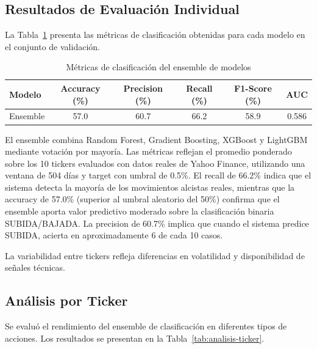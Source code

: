 \subsection{Resultados de Evaluación Individual}

La Tabla~\ref{tab:modelos-individuales} presenta las métricas de clasificación obtenidas para cada modelo en el conjunto de validación.

\begin{table}[H]
  \centering
  \caption{Métricas de clasificación del ensemble de modelos}
  \label{tab:modelos-individuales}
  \begin{tabular}{lccccc}
  \toprule
  \textbf{Modelo} & \textbf{Accuracy (\%)} & \textbf{Precision (\%)} & \textbf{Recall (\%)} & 
  \textbf{F1-Score (\%)} & \textbf{AUC} \\
  \midrule
  Ensemble  & 57.0 & 60.7 & 66.2 & 58.9 & 0.586 \\
  \bottomrule
  \end{tabular}
  \end{table}

  El ensemble combina Random Forest, Gradient Boosting, XGBoost y LightGBM mediante votación por mayoría. Las métricas reflejan el promedio ponderado sobre los 10 tickers evaluados con datos reales de Yahoo Finance, utilizando una ventana de 504 días y target con umbral de 0.5\%. El recall de 66.2\% indica que el sistema detecta la mayoría de los movimientos alcistas reales, mientras que la accuracy de 57.0\% (superior al umbral aleatorio del 50\%) confirma que el ensemble aporta valor predictivo moderado sobre la clasificación binaria SUBIDA/BAJADA. La precision de 60.7\% implica que cuando el sistema predice SUBIDA, acierta en aproximadamente 6 de cada 10 casos.

 La variabilidad entre tickers refleja diferencias en volatilidad y disponibilidad 
  de señales técnicas.
  
\subsection{Análisis por Ticker}

  Se evaluó el rendimiento del ensemble de clasificación en diferentes tipos de acciones. Los 
  resultados se presentan en la Tabla~\ref{tab:analisis-ticker}.

